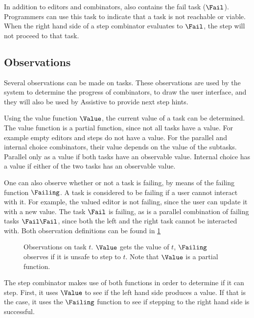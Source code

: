 In addition to editors and combinators, \TOPHAT also contains the fail task ($\Fail$).
Programmers can use this task to indicate that a task is not reachable or viable.
When the right hand side of a step combinator evaluates to $\Fail$, the step will not proceed to that task.


\subsection{Observations}

Several observations can be made on tasks.
These observations are used by the system to determine the progress of combinators,
to draw the user interface, and they will also be used by Assistive \TOPHAT to provide next step hints.

Using the value function $\Value$, the current value of a task can be determined.
The value function is a partial function, since not all tasks have a value.
For example empty editors and steps do not have a value.
For the parallel and internal choice combinators, their value depends on the value of the subtasks.
Parallel only as a value if both tasks have an observable value.
Internal choice has a value if either of the two tasks has an observable value.

One can also observe whether or not a task is failing, by means of the failing function $\Failing$.
A task is considered to be failing if a user cannot interact with it.
For example, the valued editor is not failing, since the user can update it with a new value.
The task $\Fail$ is failing, as is a parallel combination of failing tasks $\Fail \And \Fail$, since both the left and the right task cannot be interacted with.
Both observation definitions can be found in \cref{fig:observations}

\begin{figure}[h]
  \begin{minipage}{\textwidth}
    \centering \small
      
  \end{minipage}
  \caption{
    Observations on task $t$.
    $\Value$ gets the value of $t$, $\Failing$ observes if it is unsafe to step to $t$.
    Note that $\Value$ is a partial function.
  }
  \label{fig:observations}
\end{figure}

The step combinator makes use of both functions in order to determine if it can step.
First, it uses $\Value$ to see if the left hand side produces a value.
If that is the case, it uses the $\Failing$ function to see if stepping to the right hand side is successful.


